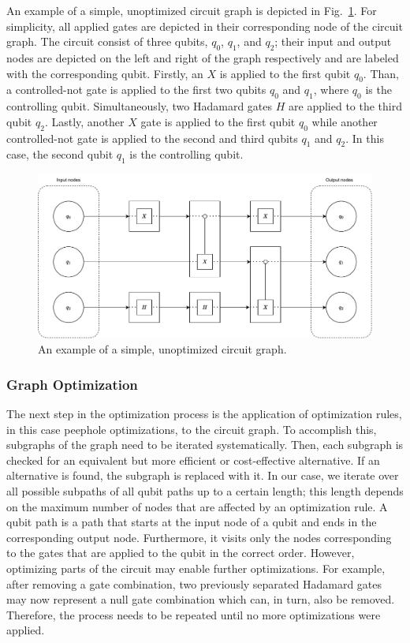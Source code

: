 An example of a simple, unoptimized circuit graph is depicted in Fig.~\ref{fig:circuit_graph_unoptimized}. For simplicity, all applied gates are depicted in their corresponding node of the circuit graph. The circuit consist of three qubits, $q_0$, $q_1$, and $q_2$; their input and output nodes are depicted on the left and right of the graph respectively and are labeled with the corresponding qubit. Firstly, an $X$ is applied to the first qubit $q_0$. Than, a controlled-not gate is applied to the first two qubits $q_0$ and $q_1$, where $q_0$ is the controlling qubit. Simultaneously, two Hadamard gates $H$ are applied to the third qubit $q_2$. Lastly, another $X$ gate is applied to the first qubit $q_0$ while another controlled-not gate is applied to the second and third qubits $q_1$ and $q_2$. In this case, the second qubit $q_1$ is the controlling qubit.

\begin{figure}[htp]
    \centering     
    \includegraphics[width=.9\textwidth]{../figures/circuit_graph_unoptimized.pdf}
    \caption{An example of a simple, unoptimized circuit graph.}
    \label{fig:circuit_graph_unoptimized}
\end{figure}

\subsubsection{Graph Optimization}
The next step in the optimization process is the application of optimization rules, in this case peephole optimizations, to the circuit graph. To accomplish this, subgraphs of the graph need to be iterated systematically. Then, each subgraph is checked for an equivalent but more efficient or cost-effective alternative. If an alternative is found, the subgraph is replaced with it. In our case, we iterate over all possible subpaths of all qubit paths up to a certain length; this length depends on the maximum number of nodes that are affected by an optimization rule. A qubit path is a path that starts at the input node of a qubit and ends in the corresponding output node. Furthermore, it visits only the nodes corresponding to the gates that are applied to the qubit in the correct order. However, optimizing parts of the circuit may enable further optimizations. For example, after removing a gate combination, two previously separated Hadamard gates may now represent a null gate combination which can, in turn, also be removed. Therefore, the process needs to be repeated until no more optimizations were applied.

